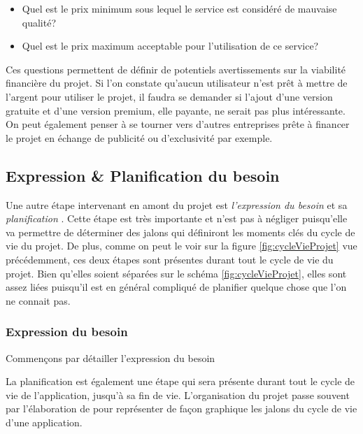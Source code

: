 \begin{itemize}
	\setlength\itemsep{-0.5em}
	\item Quel est le prix minimum sous lequel le service est considéré de mauvaise qualité?
	\item Quel est le prix maximum acceptable pour l'utilisation de ce service?
\end{itemize}

Ces questions permettent de définir de potentiels avertissements sur la viabilité financière du projet. Si l'on constate qu'aucun utilisateur n'est prêt à mettre de l'argent pour utiliser le projet, il faudra se demander si l'ajout d'une version gratuite et d'une version premium, elle payante, ne serait pas plus intéressante. On peut également penser à se tourner vers d'autres entreprises prête à financer le projet en échange de publicité ou d'exclusivité par exemple.


\subsection{Expression \& Planification du besoin}

Une autre étape intervenant en amont du projet est \emph{l'expression du besoin} et sa \emph{planification} . Cette étape est très importante et n'est pas à négliger puisqu'elle va permettre de déterminer des jalons qui définiront les moments clés du cycle de vie du projet. De plus, comme on peut le voir sur la figure \ref{fig:cycleVieProjet} vue précédemment, ces deux étapes sont présentes durant tout le cycle de vie du projet. Bien qu'elles soient séparées sur le schéma \ref{fig:cycleVieProjet}, elles sont assez liées puisqu'il est en général compliqué de planifier quelque chose que l'on ne connait pas.

\subsubsection{Expression du besoin}

Commençons par détailler l'expression du besoin

La planification est également une étape qui sera présente durant tout le cycle de vie de l'application, jusqu’à sa fin de vie. L'organisation du projet passe souvent par l'élaboration de  pour représenter de façon graphique les jalons du cycle de vie d'une application.

